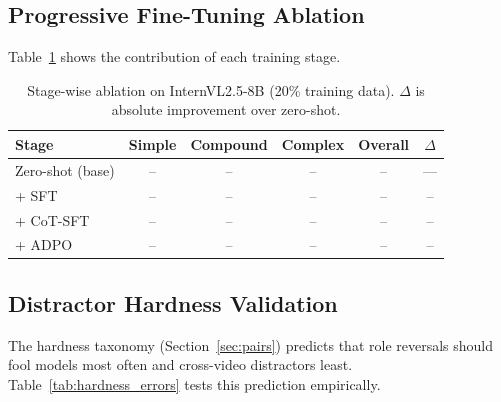 
\subsection{Progressive Fine-Tuning Ablation}

Table~\ref{tab:ablation} shows the contribution of each training stage.

\begin{table}[t]
\centering
\caption{Stage-wise ablation on InternVL2.5-8B (20\% training data).
$\Delta$ is absolute improvement over zero-shot.}
\label{tab:ablation}
\small
\begin{tabular}{lccccc}
\toprule
Stage & Simple & Compound & Complex & Overall & $\Delta$ \\
\midrule
Zero-shot (base)   & -- & -- & -- & -- & ---   \\
+ SFT              & -- & -- & -- & -- & --    \\
+ CoT-SFT          & -- & -- & -- & -- & --    \\
+ ADPO             & -- & -- & -- & -- & --    \\
\bottomrule
\end{tabular}
\end{table}


\subsection{Distractor Hardness Validation}

The hardness taxonomy (Section~\ref{sec:pairs}) predicts that role
reversals should fool models most often and cross-video distractors
least. Table~\ref{tab:hardness_errors} tests this prediction
empirically.

